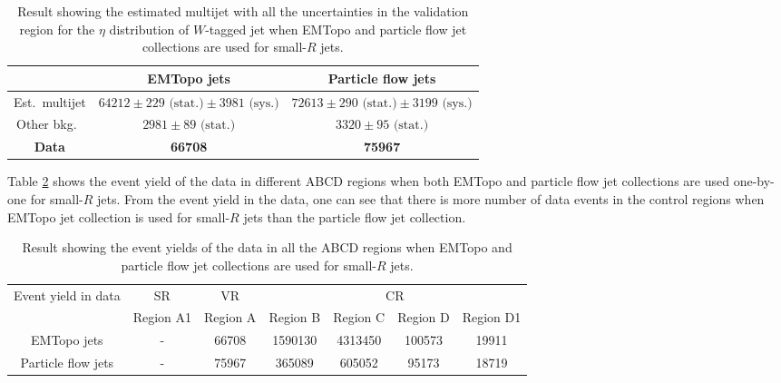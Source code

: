 \begin{table}[hbt!]
	\centering
	\begin{tabular}{c | c | c } 
		\toprule
		& EMTopo jets & Particle flow jets \\
		\midrule
		Est.\ multijet & $\num{64212} \pm \num{229} \text{ (stat.)} \pm \num{3981} \text{ (sys.)}$ & $\num{72613} \pm \num{290} \text{ (stat.)} \pm \num{3199} \text{ (sys.)}$ \\
		Other bkg.\ & $\num{2981} \pm \num{89} \text{ (stat.)}$ & $\num{3320} \pm \num{95} \text{ (stat.)}$ \\
		\midrule
		\textbf{Data} & \textbf{\num{66708}} & \textbf{\num{75967}} \\
		\bottomrule
	\end{tabular}
	\caption{Result showing the estimated multijet with all the uncertainties in the validation region for the $\eta$ distribution of $W$-tagged jet when EMTopo and particle flow jet collections are used for small-$R$ jets.}
	\label{table:results:jetcollections1}
\end{table}

Table \ref{table:results:jetcollections} shows the event yield of the data in different ABCD regions when both EMTopo and particle flow jet collections are used one-by-one for small-$R$ jets.
From the event yield in the data, one can see that there is more number of data events in the control regions when EMTopo jet collection is used for small-$R$ jets than the particle flow jet collection. 

\begin{table}[hbt!]
	\centering
	\begin{tabular}{c | c | c | c | c | c | c} 
		\toprule
		Event yield in data & SR & VR & \multicolumn{4}{c}{CR} \\ \cline{2-7}
		& Region A1 & Region A & Region B & Region C & Region D & Region D1 \\
		\midrule
		EMTopo jets & - & \num{66708} & \num{1590130} & \num{4313450} & \num{100573} & \num{19911} \\
		Particle flow jets & - & \num{75967} & \num{365089} & \num{605052} & \num{95173} & \num{18719} \\
		\bottomrule
	\end{tabular}
	\caption{Result showing the event yields of the data in all the ABCD regions when EMTopo and particle flow jet collections are used for small-$R$ jets.}
	\label{table:results:jetcollections}
\end{table}


